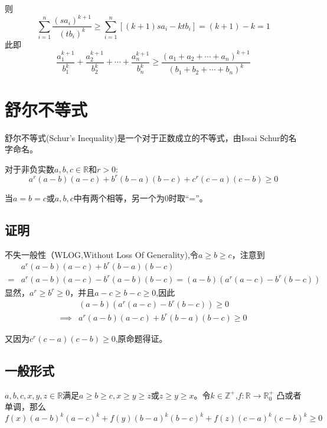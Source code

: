 \documentclass[a4paper]{article} %
\numberwithin{equation}{section} %
\begin{document}
则
\begin{equation}
\sum_{i=1}^n\frac{(sa_i)^{k+1}}{(tb_i)^k}\ge \sum_{i=1}^n\left[(k+1)sa_i-ktb_i\right ]=(k+1)-k=1
\end{equation}
此即
\begin{equation}
\frac{a_1^{k+1}}{b_1^k}+\frac{a_2^{k+1}}{b_2^k}+\cdots+\frac{a_n^{k+1}}{b_n^k}\ge \frac{(a_1+a_2+\cdots+a_n)^{k+1}}{(b_1+b_2+\cdots+b_n)^k}
\end{equation}

\section{舒尔不等式}

舒尔不等式(Schur's Inequality)是一个对于正数成立的不等式，由Issai Schur的名字命名。

对于非负实数$a,b,c\in\mathbb R$和$r>0$:
\begin{equation}
a^r(a-b)(a-c)+b^r(b-a)(b-c)+c^r(c-a)(c-b)\ge 0
\end{equation}

当$a=b=c$或$a,b,c$中有两个相等，另一个为0时取“=”。


\subsection{证明}
不失一般性（WLOG,Without Loss Of Generality),令$a\ge b\ge c$，注意到
\begin{align}
&a^r(a-b)(a-c)+b^r(b-a)(b-c) \\
=& a^r(a-b)(a-c)-b^r(a-b)(b-c)=(a-b)(a^r(a-c)-b^r(b-c))
\end{align}
显然，$a^r\ge b^r\ge 0$，并且$a-c\ge b-c\ge 0$,因此
\begin{align}
&(a-b)(a^r(a-c)-b^r(b-c))\ge 0 \\
\implies & a^r(a-b)(a-c)+b^r(b-a)(b-c)\ge 0
\end{align}


又因为$c^r(c-a)(c-b)\ge 0$,原命题得证。

\subsection{一般形式}

$a,b,c,x,y,z\in\mathbb R$满足$a\ge b\ge c,x\ge y\ge z$或$z\ge y\ge x$。令$k\in\mathbb Z^+$,$f:\mathbb R\to\mathbb R_0^+$ 凸或者单调，那么
\begin{equation}
f(x)(a-b)^k(a-c)^k+f(y)(b-a)^k(b-c)^k+f(z)(c-a)^k(c-b)^k\ge 0
\end{equation}
\end{document}
